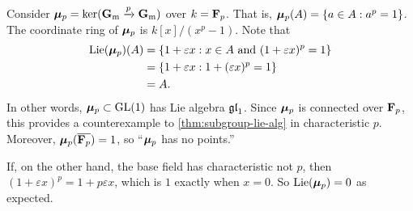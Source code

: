 \begin{example}
Consider $\bm{\mu}_p=\ker(\mathbf{G}_\mathrm{m}\xrightarrow p \mathbf{G}_\mathrm{m})$ over $k=\mathbf{F}_p$. That is, 
$\bm{\mu}_p(A)=\{a\in A:a^p=1\}$. The coordinate ring of $\bm{\mu}_p$ is 
$k[x]/(x^p-1)$. Note that  
\begin{align*}
  \operatorname{Lie}(\bm{\mu}_p)(A)
    &= \{1+\varepsilon x:x\in A\text{ and }(1+\varepsilon x)^p=1\} \\
    &= \{1+\varepsilon x:1+(\varepsilon x)^p = 1\} \\
    &= A .
\end{align*}
In other words, $\bm{\mu}_p\subset \operatorname{GL}(1)$ has Lie algebra $\mathfrak{gl}_1$. Since $\bm{\mu}_p$ 
is connected over $\mathbf{F}_p$, this provides a counterexample to 
\autoref{thm:subgroup-lie-alg} in characteristic $p$. Moreover, 
$\bm{\mu}_p(\overline{\mathbf{F}_p})=1$, so ``$\bm{\mu}_p$ has no points.''
\end{example}

If, on the other hand, the base field has 
characteristic not $p$, then $(1+\varepsilon x)^p = 1+p\varepsilon x$, which is 
$1$ exactly when $x=0$. So $\operatorname{Lie}(\bm{\mu}_p)=0$ as expected. 




